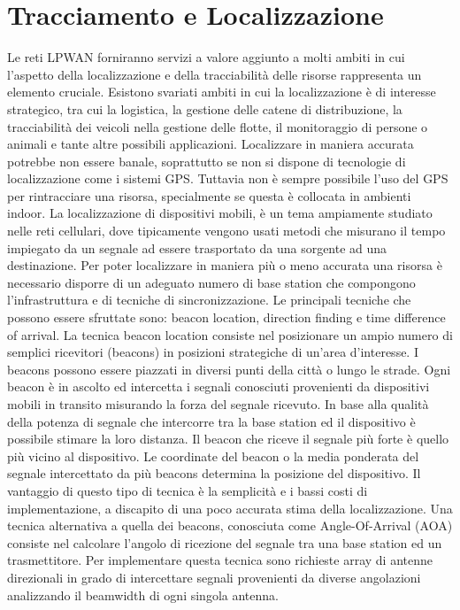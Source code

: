 \documentclass[12pt,a4paper,openright,twoside]{report}
\begin{document}
\section{Tracciamento e Localizzazione}
Le reti LPWAN forniranno servizi a valore aggiunto a molti ambiti in cui l'aspetto della localizzazione e della tracciabilit\`a delle risorse rappresenta un elemento cruciale. 
Esistono svariati ambiti in cui la localizzazione \`e di interesse strategico, tra cui  la logistica, la gestione delle catene di distribuzione, la tracciabilit\`a dei veicoli nella gestione delle flotte, il monitoraggio di persone o animali e tante altre possibili applicazioni.      
Localizzare in maniera accurata potrebbe non essere banale, soprattutto se non si dispone di tecnologie di localizzazione come i sistemi GPS. 
Tuttavia non \`e sempre possibile l'uso del GPS per rintracciare una risorsa, specialmente se questa \`e collocata in ambienti indoor.  
La localizzazione di dispositivi mobili, \`e un tema ampiamente studiato nelle reti cellulari, dove tipicamente vengono usati metodi che misurano il tempo impiegato da un segnale ad essere trasportato da una sorgente ad una destinazione.
Per poter localizzare in maniera pi\`u o meno accurata una risorsa \`e necessario disporre di un adeguato numero di base station che compongono l'infrastruttura e di tecniche di sincronizzazione.  
Le principali tecniche che possono essere sfruttate sono: beacon location, direction finding e time difference of arrival.     
La tecnica beacon location consiste nel posizionare un ampio numero di semplici ricevitori (beacons) in posizioni strategiche di un'area d'interesse. I beacons possono essere piazzati in diversi punti della citt\`a o lungo le strade. Ogni beacon \`e in ascolto ed intercetta i segnali conosciuti provenienti da dispositivi mobili in transito misurando la forza del segnale ricevuto. In base alla qualit\`a della potenza di segnale che intercorre tra la base station ed il dispositivo \`e possibile stimare la loro distanza. 
Il beacon che riceve il segnale pi\`u forte \`e quello pi\`u vicino al dispositivo. Le coordinate del beacon o la media ponderata del segnale intercettato da pi\`u beacons determina la posizione del dispositivo.
Il vantaggio di questo tipo di tecnica \`e la semplicit\`a e i bassi costi di implementazione, a discapito di una poco accurata stima della localizzazione.
Una tecnica alternativa a quella dei beacons, conosciuta come Angle-Of-Arrival (AOA) consiste nel calcolare l'angolo di ricezione del segnale tra una base station ed un trasmettitore.
Per implementare questa tecnica sono richieste array di antenne direzionali in grado di intercettare segnali provenienti da diverse angolazioni analizzando il beamwidth di ogni singola antenna.
\end{document}
